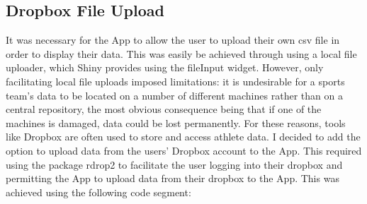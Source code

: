 \subsection{Dropbox File Upload}
It was necessary for  the App to allow the user to upload their own csv file in order to display their data. This was easily be achieved through using a local file uploader, which Shiny provides using the fileInput widget. However, only facilitating local file uploads imposed limitations: it is undesirable for a sports team's data to be located on a number of different machines rather than on a central repository, the most obvious consequence being that if one of the machines is damaged, data could be lost permanently. For these reasons, tools like Dropbox are often used to store and access athlete data. I decided to add the option to upload data from the users' Dropbox account to the App. This required using the package rdrop2 to facilitate the user logging into their dropbox and permitting the App to upload data from their dropbox to the App. This was achieved using the following code segment:

